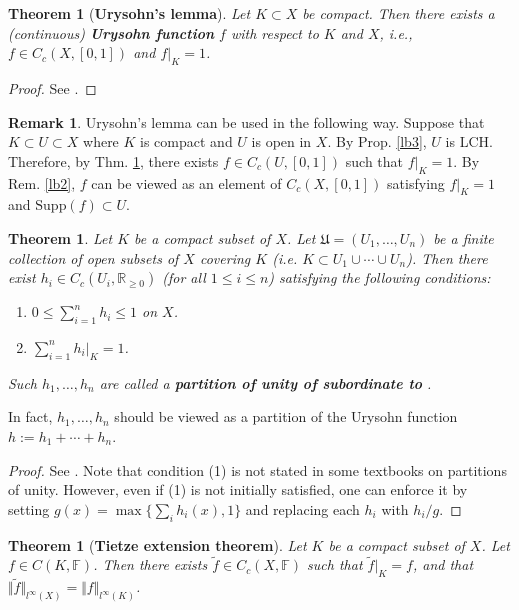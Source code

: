 \documentclass[12pt,b5paper,notitlepage]{article}
\theoremstyle{definition}
\newtheorem{rem}[df]{Remark}
\theoremstyle{plain}
\newtheorem{thm}[df]{Theorem}
\newcommand{\fk}{\mathfrak}
\newcommand{\wtd}{\widetilde}
\newcommand{\Rbb}{\mathbb R}
\newcommand{\Supp}{\mathrm{Supp}}
\newcommand{\Fbb}{\mathbb F}
\newcommand{\dps}{\displaystyle}
\numberwithin{equation}{section}
\begin{document}
\begin{thm}[\textbf{Urysohn's lemma}]\label{lb56}
Let $K\subset X$ be compact. Then there exists a (continuous) \textbf{Urysohn function}  $f$ with respect to $K$ and $X$, i.e., $f\in C_c(X,[0,1])$ and $f|_K=1$.
\end{thm}

\begin{proof}
See \cite[Sec. 15.4]{Gui-A}.
\end{proof}


\begin{rem}\label{lb57}
Urysohn's lemma can be used in the following way. Suppose that $K\subset U\subset X$ where $K$ is compact and $U$ is open in $X$. By Prop. \ref{lb3}, $U$ is LCH. Therefore, by Thm. \ref{lb56}, there exists $f\in C_c(U,[0,1])$ such that $f|_K=1$. By Rem. \ref{lb2}, $f$ can be viewed as an element of $C_c(X,[0,1])$ satisfying $f|_K=1$ and $\Supp(f)\subset U$.
\end{rem}


\begin{thm}\label{lb100}
Let $K$ be a compact subset of $X$. Let $\fk U=(U_1,\dots,U_n)$ be a finite collection of open subsets of $X$ covering $K$ (i.e. $K\subset U_1\cup\cdots\cup U_n$). Then there exist $h_i\in C_c(U_i,\Rbb_{\geq0})$ (for all $1\leq i\leq n$) satisfying the following conditions:
\begin{enumerate}[label=(\arabic*)]
\item $0\leq \dps \sum_{i=1}^nh_i\leq 1$ on $X$. 
\item  $\dps\sum_{i=1}^nh_i\big|_K=1$.
\end{enumerate}
Such $h_1,\dots,h_n$ are called a \textbf{partition of unity of  subordinate to \pmb{$\fk U$}}. 
\end{thm}

In fact, $h_1,\dots,h_n$ should be viewed as a partition of the Urysohn function $h:=h_1+\cdots+h_n$.


\begin{proof}
See \cite[Sec. 15.4]{Gui-A}. Note that condition (1) is not stated in some textbooks on partitions of unity.  However, even if (1) is not initially satisfied, one can enforce it by setting $g(x)=\max\{\sum_i h_i(x),1\}$ and replacing each $h_i$ with $h_i/g$.
\end{proof}



\begin{thm}[\textbf{Tietze extension theorem}]\label{lb83}
Let $K$ be a compact subset of $X$. Let $f\in C(K,\Fbb)$. Then there exists $\wtd f\in C_c(X,\Fbb)$ such that $\wtd f|_K=f$, and that $\Vert\wtd f\Vert_{l^\infty(X)}=\Vert f\Vert_{l^\infty(K)}$.
\end{thm}
\end{document}
